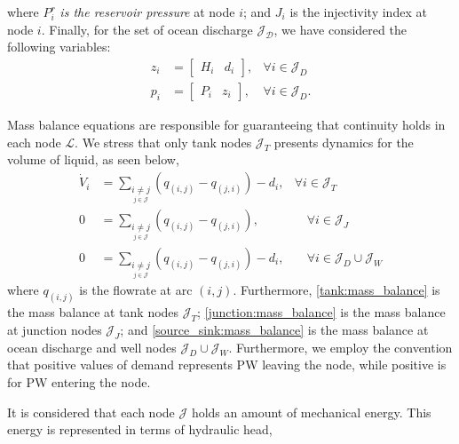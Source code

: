     where $P_i^r$ \textit{is the reservoir pressure} at node $i$; and $J_i$ is the injectivity index at node $i$. Finally, for the set of ocean discharge $\mathcal{J_D}$, we have considered the following variables:
    \begin{subequations}
    \begin{alignat}{2}
        z_i &= \left[\begin{array}{ccc}
            H_i & d_i
        \end{array}\right], & \forall i \in \mathcal{J}_D \\
        p_i &= \left[\begin{array}{cc}
            P_i & z_i
        \end{array}\right], & \forall i \in \mathcal{J}_D.
    \end{alignat}
    \end{subequations}
    \par Mass balance equations are responsible for guaranteeing that continuity holds in each node $\mathcal{L}$. We stress that only tank nodes $\mathcal{J}_T$ presents dynamics for the volume of liquid, as seen below,
    \begin{subequations}
        \begin{alignat}{2}
            \dot{V}_{i} &= \sum_{\underset{j\in\mathcal{J}}{i \neq j}}\left(q_{(i,j)} - q_{(j,i)}\right) - d_{i},& \forall i \in \mathcal{J}_T \label{tank:mass_balance}
            \\
            0 &= \sum_{\underset{j\in\mathcal{J}}{i \neq j}}\left(q_{(i,j)} - q_{(j,i)}\right), & \quad \forall i \in \mathcal{J}_J \label{junction:mass_balance}
            \\
            0 &= \sum_{\underset{j\in\mathcal{J}}{i \neq j}}\left(q_{(i,j)} - q_{(j,i)}\right) - d_{i}, &\quad \forall i \in \mathcal{J}_D \cup \mathcal{J}_W\label{source_sink:mass_balance}
        \end{alignat}
    \end{subequations}
    where $q_{(i,j)}$ is the flowrate at arc ${(i,j)}$. Furthermore, \eqref{tank:mass_balance} is the mass balance at tank nodes $\mathcal{J}_T$; 
    \eqref{junction:mass_balance} is the mass balance at junction nodes $\mathcal{J}_J$;
    and \eqref{source_sink:mass_balance} is the mass balance at ocean discharge and well nodes $\mathcal{J}_D \cup \mathcal{J}_W$. Furthermore, we employ the convention that positive values of demand represents PW leaving the node, while positive is for PW entering the node. 
    \par It is considered that each node $\mathcal{J}$ holds an amount of mechanical energy. This energy is represented in terms of hydraulic head,
